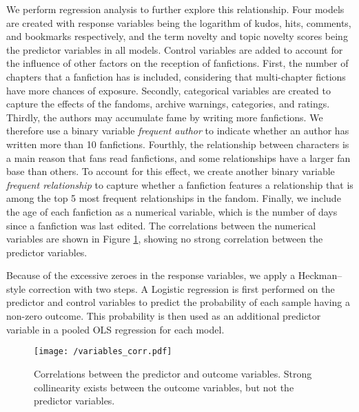 \documentclass[a4paper]{article}
\begin{document}
We perform regression analysis to further explore this relationship. Four models are created with response variables being the logarithm of kudos, hits, comments, and bookmarks respectively, and the term novelty and topic novelty scores being the predictor variables in all models. Control variables are added to account for the influence of other factors on the reception of fanfictions. First, the number of chapters that a fanfiction has is included, considering that multi-chapter fictions have more chances of exposure. Secondly, categorical variables are created to capture the effects of the fandoms, archive warnings, categories, and ratings. Thirdly, the authors may accumulate fame by writing more fanfictions. We therefore use a binary variable \emph{frequent author} to indicate whether an author has written more than 10 fanfictions. Fourthly, the relationship between characters is a main reason that fans read fanfictions, and some relationships have a larger fan base than others. To account for this effect, we create another binary variable \emph{frequent relationship} to capture whether a fanfiction features a relationship that is among the top 5 most frequent relationships in the fandom. Finally, we include the age of each fanfiction as a numerical variable, which is the number of days since a fanfiction was last edited. The correlations between the numerical variables are shown in Figure \ref{fig:corr}, showing no strong correlation between the predictor variables.

Because of the excessive zeroes in the response variables, we apply a Heckman--style correction with two steps. A Logistic regression is first performed on the predictor and control variables to predict the probability of each sample having a non-zero outcome. This probability is then used as an additional predictor variable in a pooled OLS regression for each model.

\begin{figure}
    \centering
          \texttt{[image: /variables\_corr.pdf]}
        \caption{Correlations between the predictor and outcome variables. Strong collinearity exists between the outcome variables, but not the predictor variables. }
        \label{fig:corr}
\end{figure}
\end{document}
